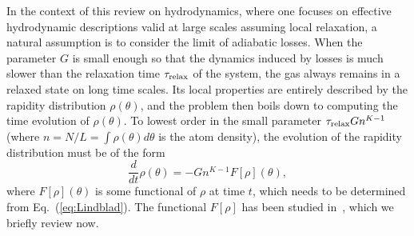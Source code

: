 \documentclass[onecolumn,amsfonts,showpacs,superscriptaddress]{revtex4-1}
\begin{document}
In the context of this review on hydrodynamics, where one focuses on effective hydrodynamic descriptions valid at large scales assuming local relaxation, a natural assumption is to consider the limit of adiabatic losses. When the parameter $G$ is small enough so that the dynamics induced by losses is much slower than the relaxation time $\tau_{\rm relax}$ of the system, the gas always remains in a relaxed state on long time scales. Its local properties are entirely described by the rapidity distribution $\rho(\theta)$, and the problem then boils down to computing the time evolution of $\rho(\theta)$. To lowest order in the small parameter $\tau_{\rm relax}G n^{K-1}$ (where $n=N/L = \int \rho(\theta) d \theta$ is the atom density), the evolution of the rapidity distribution must be of the form
\begin{equation}
    \label{eq:drho_dt_loss}
    \frac{d}{dt}\rho(\theta)= -G n^{K-1} F[\rho](\theta),
\end{equation}
where $F[\rho](\theta)$ is some functional of $\rho$ at time $t$, which needs to be determined from Eq.~(\ref{eq:Lindblad}). The functional $F[\rho]$ has been studied in~\citep{bouchoule_effect_2020}, which we briefly review now.




\vspace{0.5cm}
\end{document}
